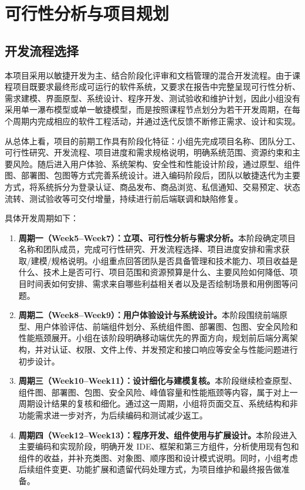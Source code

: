 ﻿\documentclass[UTF8,a4paper,12pt]{ctexart}
\begin{document}
\section{可行性分析与项目规划}

\subsection{开发流程选择}
本项目采用以敏捷开发为主、结合阶段化评审和文档管理的混合开发流程。由于课程项目既要求最终形成可运行的软件系统，又要求在报告中完整呈现可行性分析、需求建模、界面原型、系统设计、程序开发、测试验收和维护计划，因此小组没有采用单一瀑布模型或单一敏捷模型，而是按照课程节点划分为若干开发周期，在每个周期内完成相应的软件工程活动，并通过迭代反馈不断修正需求、设计和实现。

从总体上看，项目的前期工作具有阶段化特征：小组先完成项目名称、团队分工、可行性研究、开发流程、项目进度和需求规格说明，明确系统范围、资源约束和主要风险。随后进入用户体验、系统架构、安全性和性能设计阶段，通过原型、组件图、部署图、包图等方式完善系统设计。进入编码阶段后，团队以敏捷迭代为主要方式，将系统拆分为登录认证、商品发布、商品浏览、私信通知、交易预定、状态流转、测试验收等可交付增量，持续进行前后端联调和缺陷修复。

具体开发周期如下：

\begin{enumerate}
  \item \textbf{周期一（Week5--Week7）：立项、可行性分析与需求分析。}本阶段确定项目名称和团队成员，完成可行性研究、开发流程选择、项目进度安排和需求获取/建模/规格说明。小组重点回答团队是否具备管理和技术能力、项目收益是什么、技术上是否可行、项目范围和资源预算是什么、主要风险如何降低、项目时间表如何安排、需求来自哪些利益相关者以及是否绘制场景和用例图等问题。
  \item \textbf{周期二（Week8--Week9）：用户体验设计与系统设计。}本阶段围绕前端原型、用户体验评估、前端组件划分、系统组件图、部署图、包图、安全风险和性能瓶颈展开。小组在该阶段明确移动端优先的界面方向，规划前后端分离架构，并对认证、权限、文件上传、并发预定和接口响应等安全与性能问题进行初步设计。
  \item \textbf{周期三（Week10--Week11）：设计细化与建模复核。}本阶段继续检查原型、组件图、部署图、包图、安全风险、峰值容量和性能瓶颈等内容，属于对上一周期设计结果的复核和细化。通过这一周期，小组将页面交互、系统结构和非功能需求进一步对齐，为后续编码和测试减少返工。
  \item \textbf{周期四（Week12--Week13）：程序开发、组件使用与扩展设计。}本阶段进入主要编码和实现阶段，明确开发 IDE、框架和第三方组件，分析使用现有包和组件的收益，并补充类图、对象图、顺序图和设计模式说明。同时，小组考虑后续组件变更、功能扩展和遗留代码处理方式，为项目维护和最终报告做准备。
\end{enumerate}
\end{document}
